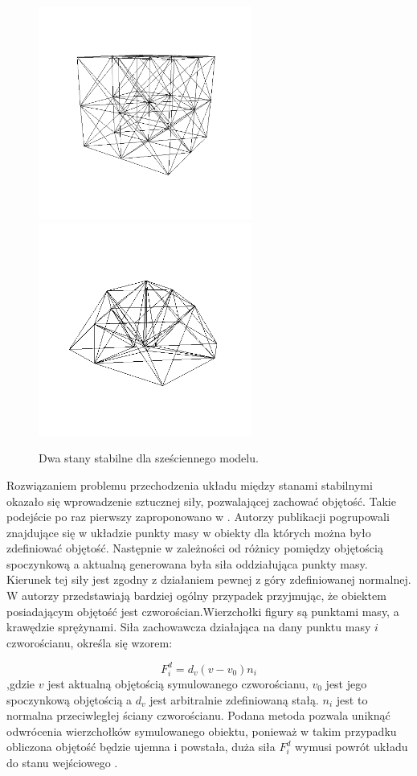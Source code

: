 \begin{figure}[ht]
\centering
\includegraphics[width=7cm, height=7cm]{images/stabilny.png}
\includegraphics[width=7cm, height=7cm]{images/niestabilny.png}
\caption{Dwa stany stabilne dla sześciennego modelu.}
\label{stany}
\end{figure}

Rozwiązaniem problemu przechodzenia układu między stanami stabilnymi okazało się wprowadzenie sztucznej siły, pozwalającej zachować objętość. Takie podejście po raz pierwszy zaproponowano w \cite{rmofa}. Autorzy publikacji pogrupowali znajdujące się w układzie punkty masy w obiekty dla których można było zdefiniować objętość. Następnie w zależności od różnicy pomiędzy objętością spoczynkową a aktualną generowana była siła oddziałująca punkty masy. Kierunek tej siły jest zgodny z działaniem pewnej z góry zdefiniowanej normalnej. W \cite{isodb} autorzy przedstawiają bardziej ogólny przypadek przyjmując, że obiektem posiadającym objętość jest czworościan.Wierzchołki figury są punktami masy, a krawędzie sprężynami. Siła zachowawcza działająca na dany punktu masy $i$ czworościanu, określa się wzorem:

\begin{equation}
F_i^d = d_v ( v - v_0) n_i
\end{equation}
,gdzie $v$ jest aktualną objętością symulowanego czworościanu, $v_0$ jest jego spoczynkową objętością a $d_v$ jest arbitralnie zdefiniowaną stałą. $n_i$ jest to normalna przeciwległej ściany czworościanu. Podana metoda pozwala uniknąć odwrócenia wierzchołków symulowanego obiektu, ponieważ w takim przypadku obliczona objętość będzie ujemna i powstała, duża siła $F_i^d$ wymusi powrót układu do stanu wejściowego \cite{isodb}.

